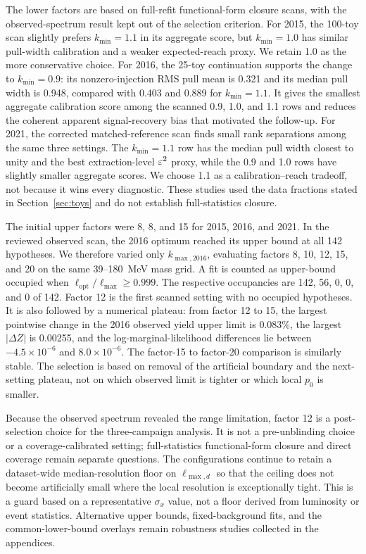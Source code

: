 The lower factors are based on full-refit functional-form closure scans, with the
observed-spectrum result kept out of the selection criterion. For 2015, the 100-toy
scan slightly prefers $k_{\min}=1.1$ in its aggregate score, but $k_{\min}=1.0$ has
similar pull-width calibration and a weaker expected-reach proxy. We retain 1.0 as the
more conservative choice. For 2016, the 25-toy continuation supports the
change to $k_{\min}=0.9$: its nonzero-injection RMS pull mean is 0.321 and its median
pull width is 0.948, compared with 0.403 and 0.889 for $k_{\min}=1.1$. It gives the
smallest aggregate calibration score among the scanned 0.9, 1.0, and 1.1 rows and
reduces the coherent apparent signal-recovery bias that motivated the follow-up. For
2021, the corrected matched-reference scan finds small rank separations among the
same three settings. The $k_{\min}=1.1$ row has the median pull width closest to
unity and the best extraction-level $\varepsilon^2$ proxy, while the 0.9 and 1.0 rows have
slightly smaller aggregate scores. We choose 1.1 as a calibration--reach tradeoff, not
because it wins every diagnostic. These studies used the data fractions stated in
Section~\ref{sec:toys} and do not establish full-statistics closure.

The initial upper factors were 8, 8, and 15 for 2015, 2016, and 2021. In the reviewed
observed scan, the 2016 optimum reached its upper bound at all 142 hypotheses. We
therefore varied only $k_{\max,2016}$, evaluating factors
8, 10, 12, 15, and 20 on the same 39--180~MeV mass grid. A fit is counted as
upper-bound occupied when $\ell_{\mathrm{opt}}/\ell_{\max}\geq0.999$. The respective
occupancies are 142, 56, 0, 0, and 0 of 142. Factor 12 is the first scanned setting
with no occupied hypotheses. It is also followed by a numerical plateau: from factor
12 to 15, the largest pointwise change in the 2016 observed yield upper limit is
0.083\%, the largest $|\Delta Z|$ is 0.00255, and the log-marginal-likelihood
differences lie between $-4.5\times10^{-6}$ and $8.0\times10^{-6}$. The factor-15 to
factor-20 comparison is similarly stable. The selection is based on removal of the
artificial boundary and the next-setting plateau, not on which observed limit is
tighter or which local $p_0$ is smaller.

Because the observed spectrum revealed the range limitation, factor 12 is a
post-selection choice for the three-campaign analysis. It is not a pre-unblinding
choice or a coverage-calibrated setting; full-statistics functional-form closure and
direct coverage remain separate questions.
The configurations continue to retain a dataset-wide median-resolution floor on
$\ell_{\max,d}$ so that the ceiling does not become artificially small where the
local resolution is exceptionally tight. This is a guard based on a representative
$\sigma_x$ value, not a floor derived from luminosity or event statistics.
Alternative upper bounds,
fixed-background fits, and the common-lower-bound overlays remain robustness studies
collected in the appendices.

